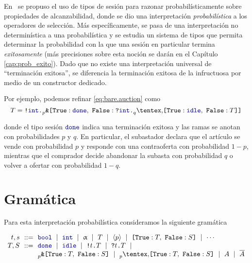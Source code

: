 \label{cap:tipos_sesion_prob}
En~\cite{DBLP:conf/concur/InversoMPTT20} se propuso el uso de tipos de sesión
para razonar probabilísticamente sobre propiedades de alcanzabilidad, donde se
dio una interpretación \emph{probabilística} a los operadores de selección. Más
específicamente, se pasa de una interpretación no determinística a una
probabilística y se estudia un sistema de tipos que permita determinar la
probabilidad con la que una sesión en particular termina \emph{exitosamente}
(más precisiones sobre esta noción se darán en el Capítulo
\ref{cap:prob_exito}).  Dado que no existe una interpretación universal de
``terminación exitosa'', se diferencia la terminación exitosa de la infructuosa
por medio de un constructor dedicado.

Por ejemplo, podemos refinar \eqref{eq:bare.auction} como
\begin{equation}
    \label{eq:refined.auction}
    \T = \Out\tint{
        \BinaryPBranch[p]\Done{
            \In\tint{
                \BinaryPChoice[q]\Idle\T
            }
        }
    }
\end{equation}

donde el tipo sesión $\Done$ indica una terminación exitosa y las
ramas se anotan con probabilidades $p$ y $q$. En particular, el subastador
declara que el artículo se vende con probabilidad $p$ y responde con una
contraoferta con probabilidad $1-p$, mientras que el comprador decide abandonar
la subasta con probabilidad $q$ o volver a ofertar con probabilidad $1-q$.

\section{Gramática}
\label{sec:gramatica_prob}

Para esta interpretación probabilística consideramos la siguiente gramática

\[
\begin{array}{@{}r@{~~}c@{~~}l@{}}
\TypeT, \TypeS & ::= &
\tbool
\rulemid \tint
\rulemid \tvar
\rulemid \SessionType
\rulemid \ClosedSessionType
\rulemid \BinaryLabels{\SessionTypeT}{\SessionTypeS}
\rulemid \cdots
\\
\SessionTypeT, \SessionTypeS & ::= &
\Done
\rulemid \Idle
\rulemid \Out\Type\SessionType
\rulemid \In\Type\SessionType
\rulemid
\\
	& &
\BinaryPBranch[p]\SessionTypeT\SessionTypeS
\rulemid \BinaryPChoice[p]\SessionTypeT\SessionTypeS
\rulemid \etvarA
\rulemid \dual\etvarA
\end{array}
\]

